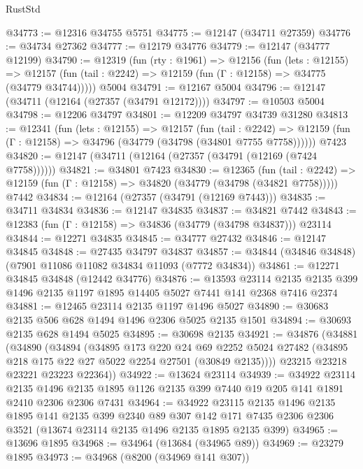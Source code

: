 \begin{lexlean}{RustStd}
\begin{coremodule}
@34773 := @12316 @34755 @5751
@34775 := @12147 (@34711 @27359)
@34776 := @34734 @27362
@34777 := @12179 @34776
@34779 := @12147 (@34777 @12199)
@34790 := @12319
    (fun (rty : @1961) =>
    @12156
      (fun (lets : @12155) =>
      @12157 (fun (tail : @2242) => @12159 (fun (Γ : @12158) => @34775 (@34779 @34744)))))
    @5004
@34791 := @12167 @5004
@34796 := @12147 (@34711 (@12164 (@27357 (@34791 @12172))))
@34797 := @10503 @5004
@34798 := @12206 @34797
@34801 := @12209 @34797 @34739 @31280
@34813 := @12341
    (fun (lets : @12155) =>
    @12157
      (fun (tail : @2242) =>
      @12159 (fun (Γ : @12158) => @34796 (@34779 (@34798 (@34801 @7755 @7758))))))
    @7423
@34820 := @12147 (@34711 (@12164 (@27357 (@34791 (@12169 (@7424 @7758))))))
@34821 := @34801 @7423
@34830 := @12365
    (fun (tail : @2242) => @12159 (fun (Γ : @12158) => @34820 (@34779 (@34798 (@34821 @7758)))))
    @7442
@34834 := @12164 (@27357 (@34791 (@12169 @7443)))
@34835 := @34711 @34834
@34836 := @12147 @34835
@34837 := @34821 @7442
@34843 := @12383 (fun (Γ : @12158) => @34836 (@34779 (@34798 @34837))) @23114
@34844 := @12271 @34835
@34845 := @34777 @27432
@34846 := @12147 @34845
@34848 := @27435 @34797 @34837
@34857 := @34844 (@34846 @34848) (@7901 @11086 @11082 @34834 @11093 (@7772 @34834))
@34861 := @12271 @34845 @34848 (@12442 @34776)
@34876 := @13593
    @23114
    @2135
    @2135
    @399
    @1496
    @2135
    @1197
    @1895
    @14405
    @5027
    @7441
    @141
    @2368
    @7416
    @2374
@34881 := @12465 @23114 @2135 @1197 @1496 @5027
@34890 := @30683 @2135 @506 @628 @1494 @1496 @2306 @5025 @2135 @1501
@34894 := @30693 @2135 @628 @1494 @5025
@34895 := @30698 @2135
@34921 := @34876
    (@34881
      (@34890
        (@34894
          (@34895
            @173
            @220
            @24
            @69
            @2252
            @5024
            @27482
            (@34895 @218 @175 @22 @27 @5022 @2254 @27501 (@30849 @2135))))
        @23215
        @23218
        @23221
        @23223
        @22364))
@34922 := @13624 @23114
@34939 := @34922
    @23114
    @2135
    @1496
    @2135
    @1895
    @1126
    @2135
    @399
    @7440
    @19
    @205
    @141
    @1891
    @2410
    @2306
    @2306
    @7431
@34964 := @34922
    @23115
    @2135
    @1496
    @2135
    @1895
    @141
    @2135
    @399
    @2340
    @89
    @307
    @142
    @171
    @7435
    @2306
    @2306
    @3521
    (@13674 @23114 @2135 @1496 @2135 @1895 @2135 @399)
@34965 := @13696 @1895
@34968 := @34964 (@13684 (@34965 @89))
@34969 := @23279 @1895
@34973 := @34968 (@8200 (@34969 @141 @307))

\end{coremodule}
\end{lexlean}
